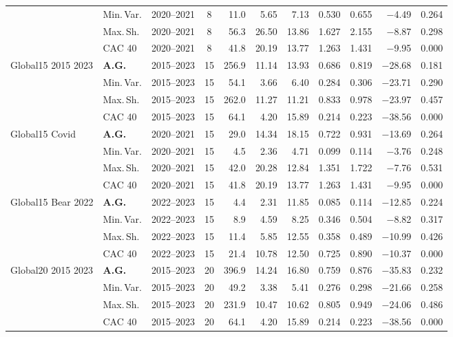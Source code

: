 \begin{longtable}{p{2.6cm} l c c r r r r r r r}
 & Min.\,Var. & 2020--2021 & 8 & 11.0 & 5.65 & 7.13 & 0.530 & 0.655 & $-$4.49 & 0.264 \\
 & Max.\,Sh. & 2020--2021 & 8 & 56.3 & 26.50 & 13.86 & 1.627 & 2.155 & $-$8.87 & 0.298 \\
 & CAC 40 & 2020--2021 & 8 & 41.8 & 20.19 & 13.77 & 1.263 & 1.431 & $-$9.95 & 0.000 \\
\midrule
Global15 2015 2023 & \textbf{A.G.} & 2015--2023 & 15 & 256.9 & 11.14 & 13.93 & 0.686 & 0.819 & $-$28.68 & 0.181 \\
 & Min.\,Var. & 2015--2023 & 15 & 54.1 & 3.66 & 6.40 & 0.284 & 0.306 & $-$23.71 & 0.290 \\
 & Max.\,Sh. & 2015--2023 & 15 & 262.0 & 11.27 & 11.21 & 0.833 & 0.978 & $-$23.97 & 0.457 \\
 & CAC 40 & 2015--2023 & 15 & 64.1 & 4.20 & 15.89 & 0.214 & 0.223 & $-$38.56 & 0.000 \\
\midrule
Global15 Covid & \textbf{A.G.} & 2020--2021 & 15 & 29.0 & 14.34 & 18.15 & 0.722 & 0.931 & $-$13.69 & 0.264 \\
 & Min.\,Var. & 2020--2021 & 15 & 4.5 & 2.36 & 4.71 & 0.099 & 0.114 & $-$3.76 & 0.248 \\
 & Max.\,Sh. & 2020--2021 & 15 & 42.0 & 20.28 & 12.84 & 1.351 & 1.722 & $-$7.76 & 0.531 \\
 & CAC 40 & 2020--2021 & 15 & 41.8 & 20.19 & 13.77 & 1.263 & 1.431 & $-$9.95 & 0.000 \\
\midrule
Global15 Bear 2022 & \textbf{A.G.} & 2022--2023 & 15 & 4.4 & 2.31 & 11.85 & 0.085 & 0.114 & $-$12.85 & 0.224 \\
 & Min.\,Var. & 2022--2023 & 15 & 8.9 & 4.59 & 8.25 & 0.346 & 0.504 & $-$8.82 & 0.317 \\
 & Max.\,Sh. & 2022--2023 & 15 & 11.4 & 5.85 & 12.55 & 0.358 & 0.489 & $-$10.99 & 0.426 \\
 & CAC 40 & 2022--2023 & 15 & 21.4 & 10.78 & 12.50 & 0.725 & 0.890 & $-$10.37 & 0.000 \\
\midrule
Global20 2015 2023 & \textbf{A.G.} & 2015--2023 & 20 & 396.9 & 14.24 & 16.80 & 0.759 & 0.876 & $-$35.83 & 0.232 \\
 & Min.\,Var. & 2015--2023 & 20 & 49.2 & 3.38 & 5.41 & 0.276 & 0.298 & $-$21.66 & 0.258 \\
 & Max.\,Sh. & 2015--2023 & 20 & 231.9 & 10.47 & 10.62 & 0.805 & 0.949 & $-$24.06 & 0.486 \\
 & CAC 40 & 2015--2023 & 20 & 64.1 & 4.20 & 15.89 & 0.214 & 0.223 & $-$38.56 & 0.000 \\
\midrule

\end{longtable}
